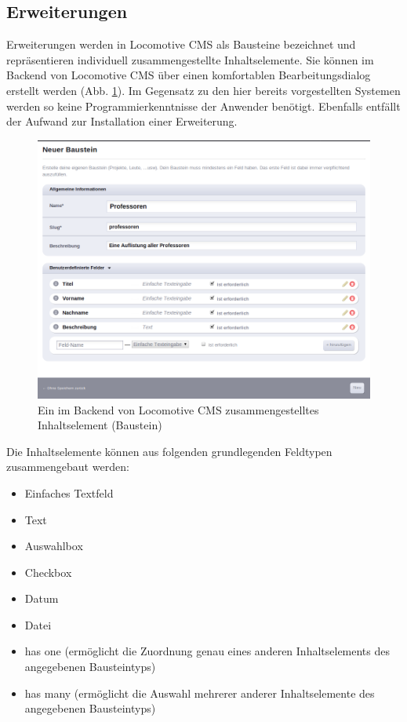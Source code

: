 \subsection{Erweiterungen}
\label{sec:ErweiterungenLocomotive}
Erweiterungen werden in Locomotive CMS als Bausteine bezeichnet und repräsentieren individuell zusammengestellte Inhaltselemente. Sie können im Backend von Locomotive CMS über einen komfortablen Bearbeitungsdialog erstellt werden (Abb. \ref{locomotivecontent}). Im Gegensatz zu den hier bereits vorgestellten Systemen werden so keine Programmierkenntnisse der Anwender benötigt. Ebenfalls entfällt der Aufwand zur Installation einer Erweiterung.
\begin{figure}[!h]
\begin{center}
\includegraphics[scale=0.45]{images/analyse/locomotive/customcontent.png}
\caption{Ein im Backend von Locomotive CMS zusammengestelltes Inhaltselement (Baustein)}
\label{locomotivecontent}
\end{center}
\end{figure}
\newpage
Die Inhaltselemente können aus folgenden grundlegenden Feldtypen zusammengebaut werden:
\begin{itemize}
\item
Einfaches Textfeld
\item
Text
\item
Auswahlbox
\item
Checkbox
\item
Datum
\item
Datei
\item
has one (ermöglicht die Zuordnung genau eines anderen Inhaltselements des angegebenen Bausteintyps)
\item
has many (ermöglicht die Auswahl mehrerer anderer Inhaltselemente des angegebenen Bausteintyps)
\end{itemize}

